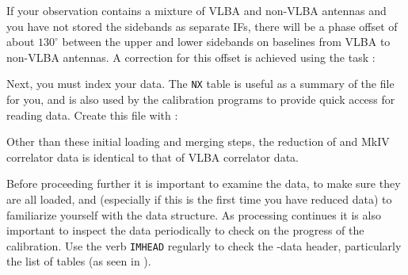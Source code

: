 
If your observation contains a mixture of VLBA and non-VLBA antennas
and you have not stored the sidebands as separate IFs, there will be a
phase offset of about $130^{\circ}$ between the upper and lower
sidebands on baselines from VLBA to non-VLBA antennas.  A correction
for this offset is achieved using the task {\tt {}}:


Next, you must index your data.  The {\tt NX} table is useful as a
summary of the file for you, and is also used by the calibration
programs to provide quick access for reading data.  Create this file
with {\tt {}}:
\pd

Other than these initial loading and merging steps, the reduction of
 and MkIV correlator data is identical to that of VLBA
correlator data.

{}

Before proceeding further it is important to examine the data, to make
sure they are all loaded, and (especially if this is the first time
you have reduced  data) to familiarize yourself with the
data structure.  As processing continues it is also important to
inspect the data periodically to check on the progress of the
calibration.  Use the verb {\tt IMHEAD} regularly to check the
\uv-data header, particularly the list of tables (as seen in
).

